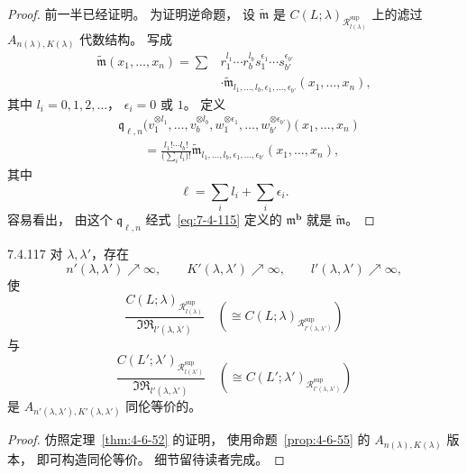 \begin{proof}
前一半已经证明。
为证明逆命题，
设 $\widetilde{\mathfrak m}$
是
$C(L;\lambda)_{\mathcal R^{\mathrm{sup}}_{l(\lambda)}}$
上的滤过
$A_{n(\lambda),K(\lambda)}$ 代数结构。
写成
\[
\begin{aligned}
\widetilde{\mathfrak m}(x_1,\ldots,x_n)
=\sum
&r_1^{l_1}\cdots r_b^{l_b}
s_1^{\epsilon_1}\cdots s_{b'}^{\epsilon_{b'}}\\
&\cdot
\widetilde{\mathfrak m}_
{l_1,\ldots,l_b,\epsilon_1,\ldots,\epsilon_{b'}}
(x_1,\ldots,x_n),
\end{aligned}
\]
其中 $l_i=0,1,2,\ldots$，
$\epsilon_i=0$ 或 $1$。
定义
\[
\begin{aligned}
&\mathfrak q_{\ell,n}
\bigl(
v_1^{\otimes l_1},\ldots,v_b^{\otimes l_b},
w_1^{\otimes\epsilon_1},\ldots,
w_{b'}^{\otimes\epsilon_{b'}}
\bigr)(x_1,\ldots,x_n)\\
&\qquad=
\frac{l_1!\cdots l_b!}
{\bigl(\sum_i l_i\bigr)!}
\widetilde{\mathfrak m}_
{l_1,\ldots,l_b,\epsilon_1,\ldots,\epsilon_{b'}}
(x_1,\ldots,x_n),
\end{aligned}
\]
其中
\[
\ell=\sum_i l_i+\sum_i\epsilon_i.
\]
容易看出，
由这个 $\mathfrak q_{\ell,n}$
经式~\eqref{eq:7-4-115}
定义的 $\mathfrak m^{\mathbf b}$
就是 $\widetilde{\mathfrak m}$。
\end{proof}

\begin{lemma}{7.4.117}\label{lem:7-4-117}
对 $\lambda,\lambda'$，存在
\[
n'(\lambda,\lambda')\nearrow\infty,
\qquad
K'(\lambda,\lambda')\nearrow\infty,
\qquad
l'(\lambda,\lambda')\nearrow\infty,
\]
使
\[
\frac{
C(L;\lambda)_{\mathcal R^{\mathrm{sup}}_{l(\lambda)}}
}{
\mathfrak{IR}_{l'(\lambda,\lambda')}
}
\quad
\left(
\cong
C(L;\lambda)_
{\mathcal R^{\mathrm{sup}}_{l'(\lambda,\lambda')}}
\right)
\]
与
\[
\frac{
C(L';\lambda')_{\mathcal R^{\mathrm{sup}}_{l(\lambda')}}
}{
\mathfrak{IR}_{l'(\lambda,\lambda')}
}
\quad
\left(
\cong
C(L';\lambda')_
{\mathcal R^{\mathrm{sup}}_{l'(\lambda,\lambda')}}
\right)
\]
是
$A_{n'(\lambda,\lambda'),K'(\lambda,\lambda')}$
同伦等价的。
\end{lemma}

\begin{proof}
仿照定理~\ref{thm:4-6-52} 的证明，
使用命题~\ref{prop:4-6-55} 的
$A_{n(\lambda),K(\lambda)}$ 版本，
即可构造同伦等价。
细节留待读者完成。
\end{proof}


